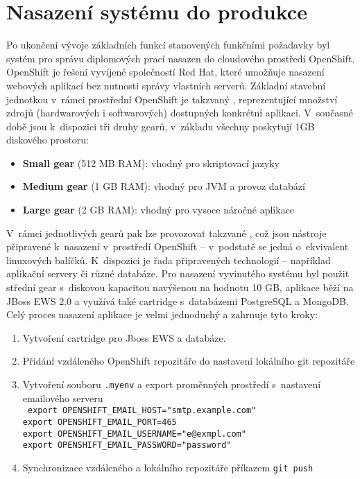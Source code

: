 \chapter{Nasazení systému do produkce}
Po ukončení vývoje základních funkcí stanovených funkčními požadavky byl systém pro správu diplomových prací nasazen do cloudového prostředí OpenShift. OpenShift je  řešení vyvíjené společností Red Hat, které umožňuje nasazení webových aplikací bez nutnosti správy vlastních serverů. Základní stavební jednotkou v~rámci prostřední OpenShift je takzvaný , reprezentující množství zdrojů (hardwarových i softwarových) dostupných konkrétní aplikaci. V~současné době jsou k~dispozici tři druhy gearů, v~základu všechny poskytují 1GB diskového prostoru\cite{openshift-pricing}:

\begin{itemize}
\item \textbf{Small gear} (512 MB RAM): vhodný pro skriptovací jazyky
\item \textbf{Medium gear} (1 GB RAM): vhodný pro JVM a provoz databází
\item \textbf{Large gear} (2 GB RAM): vhodný pro vysoce náročné aplikace
\end{itemize}

V~rámci jednotlivých gearů pak lze provozovat takzvané , což jsou nástroje připravené k~nasazení v~prostředí OpenShift -- v~podstatě se jedná o~ekvivalent linuxových balíčků. K~dispozici je řada připravených technologií -- například aplikační servery či různé databáze. Pro nasazení vyvinutého systému byl použit střední gear s~diskovou kapacitou navýšenou na hodnotu 10 GB, aplikace běží na JBoss EWS 2.0 a využívá také cartridge s~databázemi PostgreSQL a MongoDB. Celý proces nasazení aplikace je velmi jednoduchý a zahrnuje tyto kroky:

\begin{enumerate}
\item Vytvoření cartridge pro Jboss EWS a databáze.
\item Přidání vzdáleného OpenShift repozitáře do nastavení lokálního git repozitáře
\item Vytvoření souboru \texttt{.myenv} a export proměnných prostředí s~nastavení emailového serveru \\
\texttt{
export OPENSHIFT\_EMAIL\_HOST="smtp.example.com"\\
export OPENSHIFT\_EMAIL\_PORT=465\\
export OPENSHIFT\_EMAIL\_USERNAME="e@exmpl.com"\\
export OPENSHIFT\_EMAIL\_PASSWORD="password"\\
}
\item Synchronizace vzdáleného a lokálního repozitáře příkazem \texttt{git push}
\end{enumerate}
